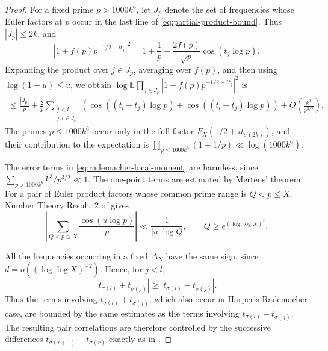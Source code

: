 \documentclass[a4paper,12pt,reqno]{amsart}
\numberwithin{equation}{section}
\theoremstyle{remark}
\newcommand{\E}{\mathbb{E}}
\begin{document}
\begin{proof}
For a fixed prime $p>1000k^6$, let $J_p$ denote the set of frequencies
whose Euler factors at $p$ occur in the last line of
\eqref{eq:partial-product-bound}.  Thus $|J_p|\leq2k$, and
\[
 |1+f(p)p^{-1/2-it_j}|^2
 =
 1+\frac1p+\frac{2f(p)}{\sqrt p}\cos(t_j\log p).
\]
Expanding the product over $j\in J_p$, averaging over $f(p)$, and then
using $\log(1+u)\leq u$, we obtain $\log \E\prod_{j\in J_p}
 |1+f(p)p^{-1/2-it_j}|^2$ is
\begin{align}
\leq
 \frac{|J_p|}{p}
 +\frac2p
 \sum_{\substack{j<l\\j,l\in J_p}}
 \left(
 \cos((t_l-t_j)\log p)
 +\cos((t_l+t_j)\log p)
 \right)
 +O\left(\frac{k^3}{p^{3/2}}\right).
 \label{eq:rademacher-local-moment}
\end{align}
The primes $p\leq1000k^6$ occur only in the full factor
$F_X(1/2+it_{\sigma(2k)})$, and their contribution to the expectation is \( \prod_{p\leq1000k^6}\left(1+1/p\right)
 \ll\log(1000k^6).
\)

The error terms in \eqref{eq:rademacher-local-moment} are harmless, since \(\sum_{p>1000k^6}{k^3}/{p^{3/2}}\ll1.
\)
The one-point terms are estimated by Mertens' theorem.  For a pair of
Euler product factors whose common prime range is $Q<p\leq X$, Number
Theory Result~2 of \cite[Section~2.2]{Harper2023Large} gives
\[
 \left|
 \sum_{Q<p\leq X}\frac{\cos(u\log p)}p
 \right|
 \ll\frac1{|u|\log Q},
 \qquad
 Q\geq e^{(\log\log X)^2}.
\]

All the frequencies occurring in a fixed $\Delta_N$ have the same sign, since $d=o((\log\log X)^{-2})$.
Hence, for $j<l$,
\[
 |t_{\sigma(l)}+t_{\sigma(j)}|
 \geq
 |t_{\sigma(l)}-t_{\sigma(j)}|.
\]
Thus the terms involving $t_{\sigma(l)}+t_{\sigma(j)}$, which also occur
in Harper's Rademacher case, are bounded by the same estimates as the
terms involving $t_{\sigma(l)}-t_{\sigma(j)}$.  The resulting pair
correlations are therefore controlled by the successive differences
$t_{\sigma(r+1)}-t_{\sigma(r)}$ exactly as in
\cite[Section~3.4]{Harper2023Large}.


\end{proof}
\end{document}
